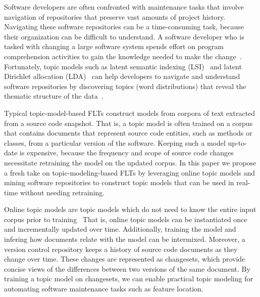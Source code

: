 
\begin{comment}
Points to make:

- Why FLTs matter
- What the problem is
- What our solution is
- How we evaluate it
- Contrib
- Organization
\end{comment}

Software developers are often confronted with maintenance tasks that involve navigation of repositories that preserve vast amounts of project history.
Navigating these software repositories can be a time-consuming task, because their organization can be difficult to understand.
A software developer who is tasked with changing a large software system spends effort on program comprehension activities to gain the knowledge needed to make the change~\cite{Corbi:1989}.
Fortunately, topic models such as
latent semantic indexing (LSI)~\cite{Deerwester-etal:1990} and
latent Dirichlet allocation (LDA)~\cite{Blei-etal:2003}
can help developers to navigate and understand software repositories
by discovering topics (word distributions) that reveal the thematic structure
of the data~\cite{Linstead-etal:2007,Thomas-etal:2011,Hindle-etal:2012}.

Typical topic-model-based FLTs construct models from corpora of text extracted from a source code snapshot.
That is, a topic model is often trained on a corpus that contains documents that
represent source code entities, such as methods or classes, from a particular version of the software.
Keeping such a model up-to-date is expensive,
because the frequency and scope of source code changes necessitate retraining the model on the updated corpus.
In this paper we propose a fresh take on topic-modeling-based FLTs
by leveraging online topic models and mining software repositories
to construct topic models that can be used in real-time without needing retraining.

Online topic models are topic models which do not need to know
the entire input corpus prior to training~\cite{Hoffman-etal:2010,Radim:2011}
That is, online topic models can be instantiated once and incrementally updated over time.
Additionally, training the model and infering how documents relate with the model
can be intermixed.
Moreover, a version control repository keeps a history of source code documents as they change over time.
These changes are represented as changesets,
which provide concise views of the differences between two versions of the same document.
By training a topic model on changesets, we can enable practical topic
modeling for automating software maintenance tasks such as feature
location.

